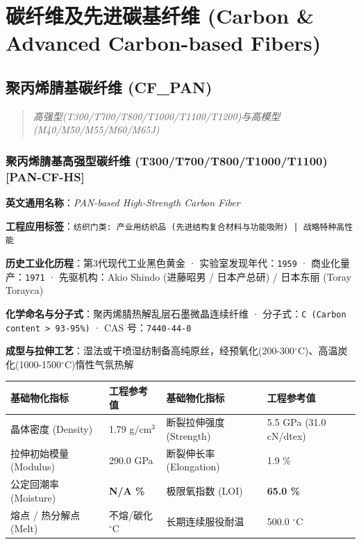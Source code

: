 \documentclass[11pt,openright,twoside,UTF8]{ctexbook}
\begin{document}
\part{碳纤维及先进碳基纤维 (Carbon \& Advanced Carbon-based Fibers)}

\chapter{聚丙烯腈基碳纤维 (CF\_PAN)}
\begin{quote}
\small\itshape
高强型(T300/T700/T800/T1000/T1100/T1200)与高模型(M40/M50/M55/M60/M65J)
\end{quote}

\section{聚丙烯腈基高强型碳纤维 (T300/T700/T800/T1000/T1100) [PAN-CF-HS]}
\label{sec:pan-cf-hs}

\noindent\textbf{英文通用名称}：\textit{PAN-based High-Strength Carbon Fiber}\par
\noindent\textbf{工程应用标签}：\texttt{纺织门类: 产业用纺织品 (先进结构复合材料与功能吸附) | 战略特种高性能}\par
\noindent\textbf{历史工业化历程}：第3代现代工业黑色黄金 · 实验室发现年代：\texttt{1959} · 商业化量产：\texttt{1971} · 先驱机构：Akio Shindo (进藤昭男 / 日本产总研) / 日本东丽 (Toray Torayca)\par
\noindent\textbf{化学命名与分子式}：聚丙烯腈热解乱层石墨微晶连续纤维 · 分子式：\texttt{C (Carbon content \textgreater{} 93-95\%)} · CAS 号：\texttt{7440-44-0}\par
\noindent\textbf{成型与拉伸工艺}：湿法或干喷湿纺制备高纯原丝，经预氧化(200-300$^\circ\mathrm{C}$)、高温炭化(1000-1500$^\circ\mathrm{C}$)惰性气氛热解\par

\vspace{0.15cm}
\begin{center}
\small
\begin{tabularx}{\textwidth}{p{3.8cm}Xp{3.8cm}X}
\toprule
\textbf{基础物化指标} & \textbf{工程参考值} & \textbf{基础物化指标} & \textbf{工程参考值} \\
\midrule
晶体密度 (Density) & 1.79 g/cm$^3$ & 断裂拉伸强度 (Strength) & 5.5 GPa (31.0 cN/dtex) \\
拉伸初始模量 (Modulus) & 290.0 GPa & 断裂伸长率 (Elongation) & 1.9 \% \\
公定回潮率 (Moisture) & \textbf{N/A \%} & 极限氧指数 (LOI) & \textbf{65.0 \%} \\
熔点 / 热分解点 (Melt) & 不熔/碳化 $^\circ\mathrm{C}$ & 长期连续服役耐温 & 500.0 $^\circ\mathrm{C}$ \\
\bottomrule
\end{tabularx}
\end{center}
\vspace{0.15cm}
\end{document}

